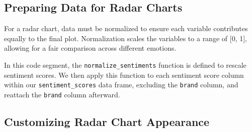 \documentclass[
]{book}
\newenvironment{Shaded}{\begin{snugshade}}{\end{snugshade}}
\newcommand{\AttributeTok}[1]{\textcolor[rgb]{0.13,0.29,0.53}{#1}}
\newcommand{\CommentTok}[1]{\textcolor[rgb]{0.56,0.35,0.01}{\textit{#1}}}
\newcommand{\ConstantTok}[1]{\textcolor[rgb]{0.56,0.35,0.01}{#1}}
\newcommand{\ControlFlowTok}[1]{\textcolor[rgb]{0.13,0.29,0.53}{\textbf{#1}}}
\newcommand{\DecValTok}[1]{\textcolor[rgb]{0.00,0.00,0.81}{#1}}
\newcommand{\FunctionTok}[1]{\textcolor[rgb]{0.13,0.29,0.53}{\textbf{#1}}}
\newcommand{\NormalTok}[1]{#1}
\newcommand{\OtherTok}[1]{\textcolor[rgb]{0.56,0.35,0.01}{#1}}
\newcommand{\SpecialCharTok}[1]{\textcolor[rgb]{0.81,0.36,0.00}{\textbf{#1}}}
\begin{document}
\hypertarget{preparing-data-for-radar-charts}{%
\subsection{Preparing Data for Radar Charts}\label{preparing-data-for-radar-charts}}

For a radar chart, data must be normalized to ensure each variable contributes equally to the final plot. Normalization scales the variables to a range of {[}0, 1{]}, allowing for a fair comparison across different emotions.

\begin{Shaded}
\end{Shaded}

In this code segment, the \texttt{normalize\_sentiments} function is defined to rescale sentiment scores. We then apply this function to each sentiment score column within our \texttt{sentiment\_scores} data frame, excluding the \texttt{brand} column, and reattach the \texttt{brand} column afterward.

\hypertarget{customizing-radar-chart-appearance}{%
\subsection*{Customizing Radar Chart Appearance}\label{customizing-radar-chart-appearance}}
\end{document}
